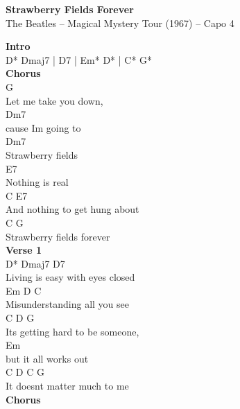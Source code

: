 \documentclass[a4paper]{article}
\begin{document}
    \begin{center}
        \textbf{Strawberry Fields Forever}
        ~\\
        The Beatles -- Magical Mystery Tour (1967)
         -- Capo 4
    \end{center}
    {
        \scriptsize
        \textbf{Intro}
        ~\\
        {
            \cutive
            \obeyspaces
 D* Dmaj7 | D7     | Em* D* | C* G*  
\\

        }
        \textbf{Chorus}
        ~\\
        {
            \cutive
            \obeyspaces
G                    
\\
  Let me take you down,
\\
                Dm7
\\
cause Im going to
\\
Dm7
\\
Strawberry fields
\\
E7
\\
  Nothing is real
\\
    C              E7
\\
And nothing to get hung about
\\
C                    G
\\
Strawberry fields forever
\\

        }
        \textbf{Verse 1}
        ~\\
        {
            \cutive
            \obeyspaces
D*        Dmaj7     D7      
\\
Living is easy with eyes closed
\\
Em      D               C
\\
Misunderstanding all you see
\\
C            D               G
\\
 Its getting hard to be someone,
\\
                  Em
\\
but it all works out
\\
C          D              C   G
\\
 It doesnt matter much to me
\\

        }
        \textbf{Chorus}
        ~\\
        {
            \cutive
            \obeyspaces

}}
\end{document}
